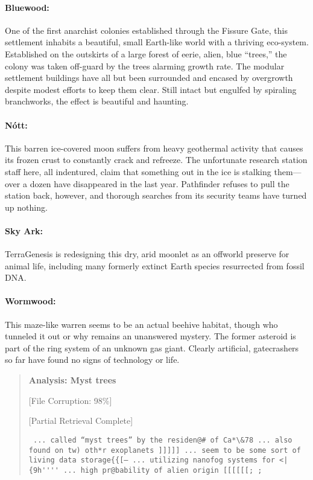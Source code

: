 \paragraph{Bluewood:}
\label{sec:bluewood} One of the first anarchist colonies established through the Fissure Gate, this settlement inhabits a beautiful, small Earth-like world with a thriving eco-system. Established on the outskirts of a large forest of eerie, alien, blue “trees,” the colony was taken off-guard by the trees alarming growth rate. The modular settlement buildings have all but been surrounded and encased by overgrowth despite modest efforts to keep them clear. Still intact but engulfed by spiraling branchworks, the effect is beautiful and haunting. 

\paragraph{Nótt:}
\label{sec:nott} This barren ice-covered moon suffers from heavy geothermal activity that causes its frozen crust to constantly crack and refreeze. The unfortunate research station staff here, all indentured, claim that something out in the ice is stalking them—over a dozen have disappeared in the last year. Pathfinder refuses to pull the station back, however, and thorough searches from its security teams have turned up nothing. 

\paragraph{Sky Ark:}
\label{sec:sky-ark} TerraGenesis is redesigning this dry, arid moonlet as an offworld preserve for animal life, including many formerly extinct Earth species resurrected from fossil DNA. 

\paragraph{Wormwood:}
\label{sec:wormwood} This maze-like warren seems to be an actual beehive habitat, though who tunneled it out or why remains an unanswered mystery. The former asteroid is part of the ring system of an unknown gas giant. Clearly artificial, gatecrashers so far have found no signs of technology or life. 

\begin{quotation}
\textbf{Analysis: Myst trees} 

 [File Corruption: 98\%] 

 [Partial Retrieval Complete] 

\begin{verbatim} ... called “myst trees” by the residen@# of Ca*\&78 ... also found on tw) oth*r exoplanets ]]]]] ... seem to be some sort of living data storage{{[— ... utilizing nanofog systems for <|{9h'''' ... high pr@bability of alien origin [[[[[[; ;
\end{verbatim}
\end{quotation} 

